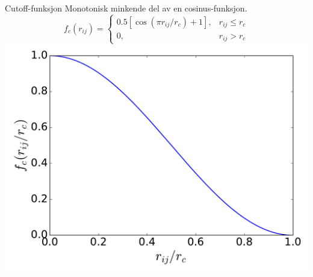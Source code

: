 \documentclass{beamer}
\begin{document}
\begin{frame}

\begin{block}{Cutoff-funksjon}
 Monotonisk minkende del av en cosinus-funksjon. 
 \begin{equation*}
  f_c(r_{ij}) = 
  \begin{cases}
   0.5 \!\left[\cos\left(\pi r_{ij}/r_c\right) + 1 \right], & r_{ij} \leq r_c \\
   0, & r_{ij} > r_c
  \end{cases}
 \end{equation*}
 \centering
 \includegraphics[width=0.7\linewidth]{../Figures/Presentation/cutoffFunction.pdf}
\end{block}

\end{frame}
\end{document}

